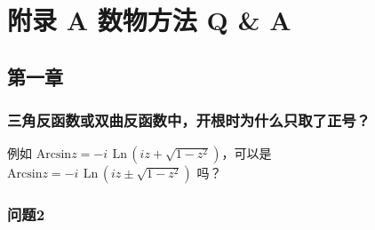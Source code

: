 \documentclass[UTF8]{report}
\def\Ln{\mathrm{\,Ln\,}}
\theoremstyle{MyLineTheoremStyle} %
\theoremstyle{MyBlockTheoremStyle} %
\theoremstyle{MySubsubsectionStyle} %
\begin{document}
\nocite{*}

\thispagestyle{fancy} 




\newpage
\appendix
\titleformat{\chapter}[hang]{\normalfont\huge\bfseries\centering}{}{20pt}{}
\titlespacing*{\chapter}{0pt}{-25pt}{8pt} %
\titleformat{\section}[hang]{\normalfont\centering\Large\bfseries}{\thesection}{8pt}{}

\chapter*{附录 A\hspace*{20pt}  数物方法 Q \& A}\setcounter{chapter}{1} 
\setcounter{equation}{0}    %
\thispagestyle{fancy} 
\setcounter{section}{0}   
\renewcommand\thesection{A.\arabic{section}}   
\renewcommand{\thefigure}{A.\arabic{figure}} 
\renewcommand{\thetable}{A.\arabic{table}}

\section{第一章}

\subsection{三角反函数或双曲反函数中，开根时为什么只取了正号？}
例如 $\mathrm{Arcsin} z = -i\ \Ln \left( iz + \sqrt{1 - z^2} \right)$，可以是 $\mathrm{Arcsin} z = -i\ \Ln \left( iz \pm \sqrt{1 - z^2} \right)$ 吗？


\subsection{问题2}
\end{document}
